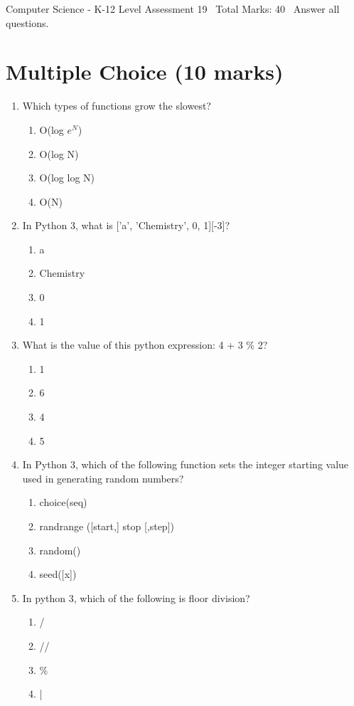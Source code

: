 \documentclass[12pt]{article}
\begin{document}
\begin{center}
Computer Science - K-12 Level Assessment 19 \
Total Marks: 40 \
Answer all questions.
\end{center}

\section*{Multiple Choice (10 marks)}
\begin{enumerate}[label=\arabic*.]
\item Which types of functions grow the slowest?
\begin{enumerate}[label=(\alph*)]
    \item O(log $e^N$)
    \item O(log N)
    \item O(log log N)
    \item O(N)
\end{enumerate}
\item In Python 3, what is ['a', 'Chemistry', 0, 1][-3]?
\begin{enumerate}[label=(\alph*)]
    \item a
    \item Chemistry
    \item 0
    \item 1
\end{enumerate}
\item What is the value of this python expression: 4 + 3 \% 2?
\begin{enumerate}[label=(\alph*)]
    \item 1
    \item 6
    \item 4
    \item 5
\end{enumerate}
\item In Python 3, which of the following function sets the integer starting value used in generating random numbers?
\begin{enumerate}[label=(\alph*)]
    \item choice(seq)
    \item randrange ([start,] stop [,step])
    \item random()
    \item seed([x])
\end{enumerate}
\item In python 3, which of the following is floor division?
\begin{enumerate}[label=(\alph*)]
    \item /
    \item //
    \item \%
    \item |
\end{enumerate}
\end{enumerate}
\end{document}
